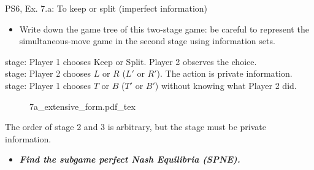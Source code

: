 \begin{frame}{PS6, Ex. 7.a: To keep or split (imperfect information)}
  \begin{itemize}
    \item[(a)] Write down the game tree of this two-stage game: be careful to represent the simultaneous-move game in the second stage using information sets.
  \end{itemize}
  \vspace{-4pt}
   stage: Player 1 chooses Keep or Split. Player 2 observes the choice.\\\medskip
   stage: Player 2 chooses $L$ or $R$ ($L'$ or $R'$). The action is private information.\\\medskip
   stage: Player 1 chooses $T$ or $B$ ($T'$ or $B'$) without knowing what Player 2 did.
  \vspace{-4pt}
  \begin{figure}[!h]
    \center
    \def\svgwidth{.8\columnwidth}
    {7a_extensive_form.pdf_tex}
  \end{figure}
  \vspace{-2pt}
  The order of stage 2 and 3 is arbitrary, but the  stage must be private information.
  \vspace{-2pt}
  \begin{itemize}
    \item[(b)] \textbf{\textit{Find the subgame perfect Nash Equilibria (SPNE).}}
  \end{itemize}
\end{frame}


